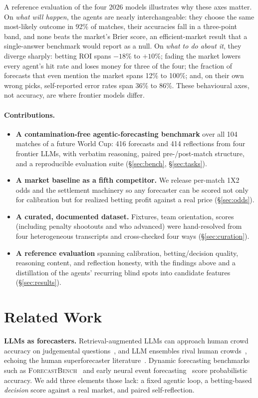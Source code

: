 \documentclass[sigconf,review]{acmart}
\begin{document}
A reference evaluation of the four 2026 models illustrates why these axes
matter. On \emph{what will happen}, the agents are nearly interchangeable: they
choose the same most-likely outcome in 92\% of matches, their accuracies fall in
a three-point band, and none beats the market's Brier score, an
efficient-market result that a single-answer benchmark would report as a null.
On \emph{what to do about it}, they diverge sharply: betting ROI spans $-18\%$
to $+10\%$; fading the market lowers every agent's hit rate and loses money for
three of the four; the fraction of
forecasts that even mention the market spans 12\% to 100\%; and, on their own
wrong picks, self-reported error rates span 36\% to 86\%. These behavioural
axes, not accuracy, are where frontier models differ.

\paragraph{Contributions.}
\begin{itemize}[leftmargin=1.1em,topsep=2pt,itemsep=1pt]
\item \textbf{A contamination-free agentic-forecasting benchmark} over all 104
  matches of a future World Cup: 416 forecasts and 414 reflections from four
  frontier LLMs, with verbatim reasoning, paired pre-/post-match structure, and
  a reproducible evaluation suite (\S\ref{sec:bench}, \S\ref{sec:tasks}).
\item \textbf{A market baseline as a fifth competitor.} We release per-match 1X2
  odds and the settlement machinery so any forecaster can be scored not only for
  calibration but for realized betting profit against a real price
  (\S\ref{sec:odds}).
\item \textbf{A curated, documented dataset.} Fixtures, team orientation, scores
  (including penalty shootouts and who advanced) were hand-resolved from four
  heterogeneous transcripts and cross-checked four ways (\S\ref{sec:curation}).
\item \textbf{A reference evaluation} spanning calibration, betting/decision
  quality, reasoning content, and reflection honesty, with the findings above
  and a distillation of the agents' recurring blind spots into candidate
  features (\S\ref{sec:results}).
\end{itemize}

\section{Related Work}
\textbf{LLMs as forecasters.} Retrieval-augmented LLMs can approach human crowd
accuracy on judgemental questions~\cite{halawi2024forecasting}, and LLM
ensembles rival human crowds~\cite{schoenegger2024wisdom}, echoing the human
superforecaster literature~\cite{tetlock2015superforecasting}. Dynamic
forecasting benchmarks such as \textsc{ForecastBench}~\cite{karger2024forecastbench}
and early neural event forecasting~\cite{zou2022forecasting} score probabilistic
accuracy. We add three elements those lack: a fixed agentic loop, a betting-based
\emph{decision} score against a real market, and paired self-reflection.
\end{document}
